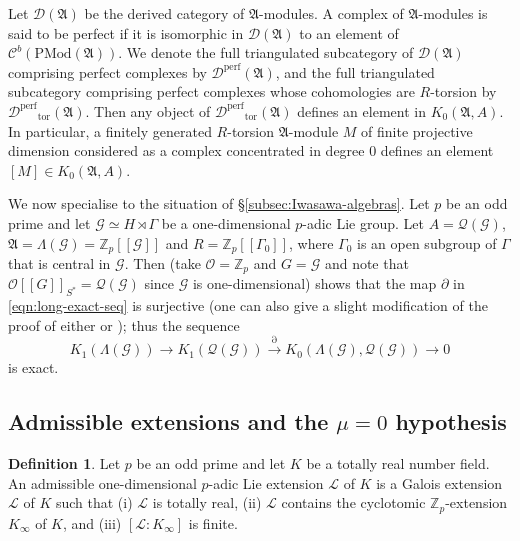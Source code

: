 \documentclass[12pt]{amsart}
\theoremstyle{plain}
\theoremstyle{remark}
\theoremstyle{definition}
\newtheorem{definition}[theorem]{Definition}
\numberwithin{equation}{section}
\begin{document}
Let $\mathcal{D} (\mathfrak{A})$ be the derived category of $\mathfrak{A}$-modules.
A complex of $\mathfrak{A}$-modules is said to be perfect if it is
isomorphic in $\mathcal{D} (\mathfrak{A})$ to an element of $\mathcal C^b({\mathrm{PMod}} (\mathfrak{A}))$.
We denote the full triangulated subcategory of
$\mathcal{D} (\mathfrak{A})$ comprising perfect complexes by $\mathcal{D}^{\mathrm{perf}} (\mathfrak{A})$,
and the full triangulated subcategory
comprising perfect complexes whose cohomologies are $R$-torsion by $\mathcal{D}^{\mathrm{perf}}{_{\mathrm{tor}}} (\mathfrak{A})$.
Then any object of $\mathcal{D}^{\mathrm{perf}}{_{\mathrm{tor}}} (\mathfrak{A})$ defines an element in
$K_{0}(\mathfrak{A}, A)$.
In particular, a finitely generated $R$-torsion $\mathfrak{A}$-module $M$ of finite projective dimension 
considered as a complex concentrated in degree $0$ defines an element $[M] \in K_{0}(\mathfrak{A}, A)$.

We now specialise to the situation of \S \ref{subsec:Iwasawa-algebras}.
Let $p$ be an odd prime and let $\mathcal{G} \simeq H \rtimes \Gamma$ be a one-dimensional $p$-adic Lie group.
Let $A = \mathcal{Q}(\mathcal{G})$, $\mathfrak{A} = \Lambda(\mathcal{G})={\mathbb{Z}}_{p}[[\mathcal{G}]]$ and $R={\mathbb{Z}}_{p}[[\Gamma_{0}]]$,
where $\Gamma_{0}$ is an open subgroup of $\Gamma$ that is central in $\mathcal{G}$.
Then \cite[Corollary 3.8]{MR3034286}  (take $\mathcal{O}={\mathbb{Z}}_{p}$ and $G=\mathcal{G}$ and note that
$\mathcal{O}[[G]]_{S^{*}}=\mathcal{Q}(\mathcal{G})$ since $\mathcal{G}$ is one-dimensional)
shows that the map $\partial$ in \eqref{eqn:long-exact-seq}
is surjective
(one can also give a slight modification of the proof of either \cite[Proposition 3.4]{MR2217048} or \cite[Lemma 1.5]{MR2819672});
thus the sequence
\begin{equation}\label{eqn:Iwasawa-K-sequence}
K_{1}(\Lambda(\mathcal{G})) \longrightarrow K_{1}(\mathcal{Q}(\mathcal{G})) \stackrel{\partial}{\longrightarrow}
K_{0}(\Lambda(\mathcal{G}),\mathcal{Q}(\mathcal{G})) \longrightarrow 0
\end{equation}
is exact.

\subsection{Admissible extensions and the $\mu=0$ hypothesis}\label{subsec:admiss-and-mu}

\begin{definition}\label{def:one-dim-adm}
Let $p$ be an odd prime and let $K$ be a totally real number field.
An admissible one-dimensional $p$-adic Lie extension $\mathcal{L}$ of $K$ is a Galois extension $\mathcal{L}$ of $K$
such that (i) $\mathcal{L}$ is totally real,
(ii) $\mathcal{L}$ contains the cyclotomic ${\mathbb{Z}}_{p}$-extension $K_{\infty}$ of $K$, and
(iii) $[\mathcal{L} : K_{\infty}]$ is finite.
\end{definition}
\end{document}
